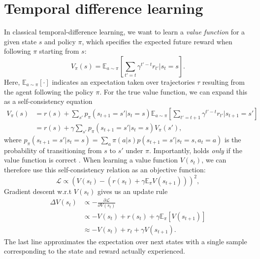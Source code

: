 \section{Temporal difference learning}
\label{sec:temporal_difference}

In classical temporal-difference learning, we want to learn a \emph{value function} for a given state $s$ and policy $\pi$, which specifies the expected future reward when following $\pi$ starting from $s$:
\begin{equation}
    \label{eq:V-values}
    V_{\pi}(s) = \mathbb{E}_{a \sim \pi} \left [ \sum_{t' = t} \gamma^{t' - t} r_{t'} | s_t = s \right ].
\end{equation}
Here, $\mathbb{E}_{a \sim \pi} [ \cdot ]$ indicates an expectation taken over trajectories $\tau$ resulting from the agent following the policy $\pi$.
For the true value function, we can expand this as a self-consistency equation
\begin{align}
    \label{eq:value_expansion}
    V_{\pi}(s) &= r(s) + \sum_{s'} p_{\pi}(s_{t+1} = s' | s_t = s) \mathbb{E}_{a \sim \pi} \left [ \sum_{t' = t+1} \gamma^{t' - t} r_{t'} | s_{t+1} = s' \right ] \\
    &=  r(s) + \gamma \sum_{s'} p_{\pi}(s_{t+1} = s' | s_t = s) V_{\pi}(s'),
\end{align}
where $p_{\pi}(s_{t+1} = s' | s_t = s) = \sum_a \pi(a|s) p(s_{t+1} = s' | s_t = s, a_t = a)$ is the probability of transitioning from $s$ to $s'$ under $\pi$.
Importantly,  holds \emph{only} if the value function is correct \citep{sutton2018reinforcement}.
%
When learning a value function $V(s_t)$, we can therefore use this self-consistency relation as an objective function:
\begin{equation}
    \mathcal{L} \propto \left (  V(s_t) - (r(s_t) + \gamma \mathbb{E}_\pi V(s_{t+1})) \right )^2,
\end{equation}
Gradient descent w.r.t $V(s_t)$ gives us an update rule
\begin{align}
    \label{eq:TD-learning}
    \Delta V(s_t) &\propto - \frac{\partial \mathcal{L}}{\partial V(s_t)}\\
    &\propto - V(s_t) + r(s_t) + \gamma \mathbb{E}_\pi \left [ V(s_{t+1}) \right ]\\
    &\approx - V(s_t) + r_t + \gamma V(s_{t+1}).
\end{align}
The last line approximates the expectation over next states with a single sample corresponding to the state and reward actually experienced.
